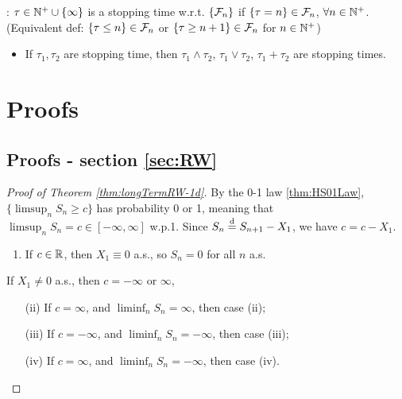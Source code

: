 \documentclass[10pt,a4paper]{article}
\begin{document}
\noindent {}: $\tau\in\mathbb N^+\cup\{\infty \}$ is a stopping time w.r.t. $\{{\cal F}_n\}$ if $\{\tau=n\}\in{\cal F}_n$, $\forall n\in\mathbb N^+$. (Equivalent def: $\{\tau\leq n\}\in{\cal F}_n$ or $\{\tau\geq n+1\}\in{\cal F}_n$ for $n\in\mathbb N^+$)
\begin{itemize}
	\item If $\tau_1,\tau_2$ are stopping time, then $\tau_1\wedge\tau_2$, $\tau_1\vee\tau_2$, $\tau_1+\tau_2$ are stopping times.    
\end{itemize}

\appendix
\section{Proofs}\label{sec:proof}
\subsection{Proofs - section \ref{sec:RW}}\label{sec:proof-RW}
\begin{proof}[Proof of Theorem \ref{thm:longTermRW-1d}]\label{proof:longTermRW-1d}
	By the 0-1 law \ref{thm:HS01Law}, $\{\limsup_n S_n\geq c\}$ has probability 0 or 1, meaning that $\limsup_n S_n=c\in [-\infty ,\infty ]$ w.p.1. Since $S_n \stackrel{\mathrm{d}}{=} S_{n+1}-X_{1}$, we have $c=c-X_1$.
\begin{enumerate}[label=(\roman*)]
	\item If $c\in\mathbb R$, then $X_1\equiv 0$ a.s., so $S_n=0$ for all $n$ a.s.
\end{enumerate}
If $X_1\neq 0$ a.s., then $c=-\infty $ or $\infty $,   
\begin{enumerate}
	\item[(ii)] If $c=\infty $, and $\liminf_n S_n=\infty $, then case (ii);
	\item[(iii)] If $c=-\infty $, and $\liminf_n S_n=-\infty $, then case (iii);
	\item[(iv)] If $c=\infty $, and $\liminf_n S_n=-\infty $, then case (iv).       
\end{enumerate}
\end{proof}




\end{document}
